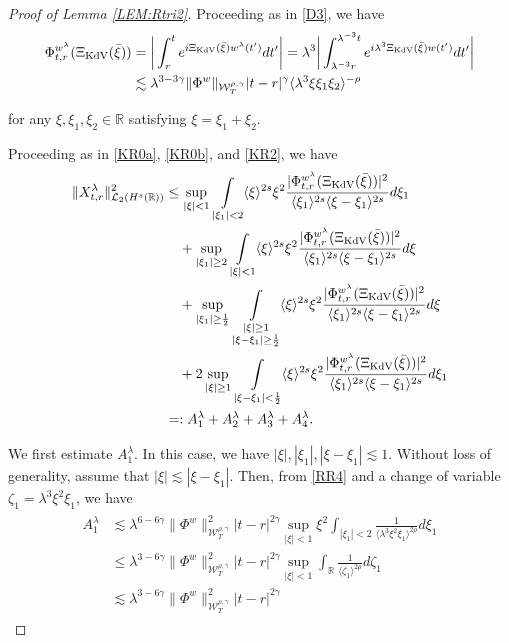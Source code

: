 \documentclass[letterpaper, 11pt,  reqno]{amsart}
\DeclareMathOperator*{\intt}{\int}
\newcommand{\1}{\hspace{0.5mm}\text{I}\hspace{0.5mm}}
\newcommand{\noi}{\noindent}
\newcommand{\R}{\mathbb{R}}
\newcommand{\g}{\gamma}
\newcommand{\ld}{\lambda}
\newcommand{\les}{\lesssim}
\newcommand{\jb}[1]
{\langle #1 \rangle}
\newcommand{\cL}{\mathcal{L}}
\newcommand{\W}{\mathcal{W}}
\newcommand{\z}{\zeta}
\newcommand{\KDV}{\text{\rm KdV} }
\numberwithin{equation}{section}
\numberwithin{theorem}{section}
\begin{document}
\begin{proof}[Proof of Lemma \ref{LEM:Rtri2}]
Proceeding as in 
 \eqref{D3}, 
we have
\begin{align}
\begin{aligned}
\Phi^{w^\ld}_{t,r} (\Xi_\KDV(\bar \xi)) 
& = \bigg| 
\int_{r}^{t}  e^{i  \Xi_\KDV (\bar \xi) w^{\ld}(t') } d t'
\bigg|
= \ld^3   \bigg|  \int_{\ld^{-3}r}^{\ld^{-3}t} 
e^{i  \ld^3  \Xi_\KDV(\bar \xi)  w(t') } dt'  \bigg|  \\
& \les 
\ld^{3 -3\g} 
 \|\Phi^{w}  \|_{\W_{T}^{\rho, \g}}
 |t-r|^{\g} 
\jb{\ld^3 \xi \xi_1 \xi_2}^{-\rho}
\end{aligned}
\label{RR4}
\end{align} 




\noi
 for any $\xi, \xi_1, \xi_2\in \R$ satisfying $\xi = \xi_1+ \xi_2$.





Proceeding as in \eqref{KR0a}, 
\eqref{KR0b}, and \eqref{KR2}, we have
\begin{align}
\|X_{t , r }^\ld\|^2_{\cL _2 (H^s (\R))}
 &
\le
\sup_{|\xi|< 1} 
  \intt_{|\xi_1|< 2} 
  \jb{\xi}^{ 2s }\xi^2
   \frac{|\Phi^{w^\ld}_{t,r} (\Xi_\KDV(\bar \xi)) |^2}{ \jb{\xi_1}^{2s}  \jb{\xi - \xi_1}^{2s}}  d\xi_1
\notag \\
& \quad + 
\sup_{|\xi_1|\ge 2}
\intt_{|\xi|< 1} \jb{\xi}^{2s}
\xi^2
\frac{|\Phi^{w^\ld}_{t,r} (\Xi_\KDV(\bar \xi)) |^2}{\jb{\xi_1}^{2s}\jb{\xi - \xi_1}^{2s}} d\xi
\notag \\ 
& \quad +
\sup_{|\xi_1|\ge \frac 12}
\intt_{\substack{|\xi|\ge 1\\|\xi-\xi_1|\ge \frac 12 }} 
\jb{\xi}^{2s}\xi^2
\frac{|\Phi^{w^\ld}_{t,r} (\Xi_\KDV(\bar \xi)) |^2}{\jb{\xi_1}^{2s}\jb{\xi - \xi_1}^{2s}} d\xi
\label{RR5} \\
& \quad +
2\sup_{|\xi|\ge 1} 
  \intt_{|\xi - \xi_1|< \frac 12} 
  \jb{\xi}^{ 2s }\xi^2
   \frac{|\Phi^{w^\ld}_{t,r} (\Xi_\KDV(\bar \xi)) |^2}{ \jb{\xi_1}^{2s}  \jb{\xi - \xi_1}^{2s}}  d\xi_1
\notag \\
& =:
A^\ld_1+ A^\ld_2 + A^\ld_3 + A^\ld_4.
\notag
\end{align}



We first estimate $A^\ld_1$.
In this case, we have $|\xi|, |\xi_1|, |\xi - \xi_1|\les 1$.
Without loss of generality, 
assume that  $|\xi| \les |\xi - \xi_1|$.
Then, from  \eqref{RR4}
and a change of variable $\z_1 = \ld^3 \xi^2 \xi_1$, we have
\begin{align}
\begin{split}
A^\ld_1 
& \les \ld^{6 -6\g} 
 \|\Phi^{w}  \|_{\W_{T}^{\rho, \g}}^2
 |t-r|^{2\g} 
\sup_{|\xi|< 1} 
\xi^2  \intt_{|\xi_1|< 2} 
\frac{1}{\jb{\ld^3 \xi^2 \xi_1 }^{2\rho}}
 d\xi_1\\
& \le \ld^{3 -6\g} 
 \|\Phi^{w}  \|_{\W_{T}^{\rho, \g}}^2
 |t-r|^{2\g} 
\sup_{|\xi|< 1} 
 \intt_\R
\frac{1}{\jb{\z_1 }^{2\rho}}
 d\z_1\\
& \les \ld^{3 -6\g} 
 \|\Phi^{w}  \|_{\W_{T}^{\rho, \g}}^2
 |t-r|^{2\g} 
 \end{split}
\label{RR6}
\end{align}


\end{proof}
\end{document}
